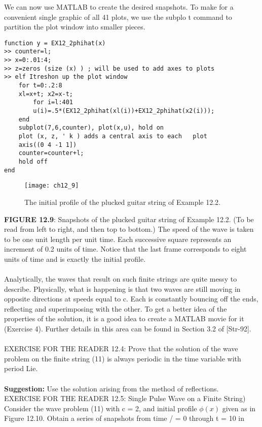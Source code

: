 \documentclass[../main.tex]{subfiles}
\begin{document}
{We can now use MATLAB to create the desired snapshots. To make for a 
convenient single graphic of all 41 plots, we use the subplo t command to 
partition the plot window into smaller pieces. 
\\
\begin{lstlisting}
function y = EX12_2phihat(x) 
>> counter=l; 
>> x=0:.01:4; 
>> z=zeros (size (x) ) ; will be used to add axes to plots 
>> elf Itreshon up the plot window 
	for t=0:.2:8 
	xl=x+t; x2=x-t; 
		for i=l:401 
		u(i)=.5*(EX12_2phihat(xl(i))+EX12_2phihat(x2(i))); 
	end 
	subplot(7,6,counter), plot(x,u), hold on 
	plot (x, z, ' k ) adds a central axis to each 	plot 
	axis((0 4 -1 1]) 
	counter=counter+l; 
	hold off 
end
\end{lstlisting}
\begin{figure}[H]
	\centering
	\texttt{[image: ch12\_9]}
	\caption{\textsf{ The initial profile of the plucked guitar string of Example 12.2.}}
	\label{pfig:ch12_9}
\end{figure}
\textbf{FIGURE 12.9}: Snapshots of the plucked guitar string of Example 12.2. (To be read from 
left to right, and then top to bottom.) The speed of the wave is taken to be one unit length 
per unit time. Each successive square represents an increment of 0.2 units of time. Notice 
that the last frame corresponds to eight units of time and is exactly the initial profile. 
\\
\\
Analytically, the waves that result on such finite strings are quite messy to 
describe. Physically, what is happening is that two waves are still moving in 
opposite directions at speeds equal to c. Each is constantly bouncing off the ends, 
reflecting and superimposing with the other. To get a better idea of the properties of the solution, it is a good idea to create a MATLAB movie for it (Exercise 4). 
Further details in this area can be found in Section 3.2 of [Str-92].
\\
\\
EXERCISE FOR THE READER 12.4: Prove that the solution of the wave 
problem on the finite string (11) is always periodic in the time variable with period 
Lie.\\
\\
\textbf{Suggestion:} Use the solution arising from the method of reflections.\\
EXERCISE FOR THE READER 12.5: {Single Pulse Wave on a Finite String) 
Consider the wave problem (11) with c = 2, and initial profile $\phi(x)$ given as in 
Figure 12.10. Obtain a series of snapshots from time / = 0 through t = 10 in 
}}
\end{document}
